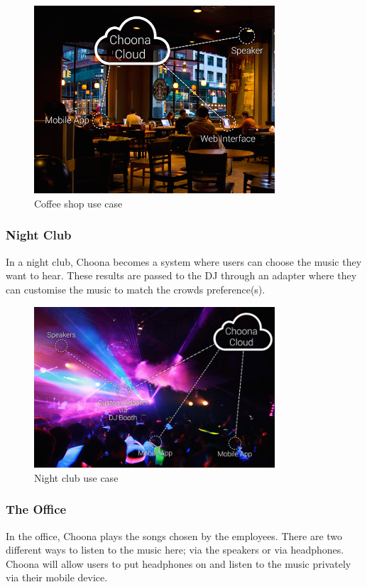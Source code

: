     \begin{figure}[h!]
      \centering
      \includegraphics[width=0.8\textwidth]{./img/coffee-shop.png}
      \caption{Coffee shop use case}
      \label{fig:coffee_shop}
    \end{figure}

\subsubsection{Night Club} 
In a night club, Choona becomes a system where users can choose the music they want to hear.  These results are passed to the DJ through an adapter where they can customise the music to match the crowds preference(s).  \\

    \begin{figure}[h!]
      \centering
      \includegraphics[width=0.8\textwidth]{./img/nightclub.png}
      \caption{Night club use case}
      \label{fig:night_club}
    \end{figure}

\subsubsection{The Office} 
In the office, Choona plays the songs chosen by the employees.  There are two different ways to listen to the music here; via the speakers or via headphones.  Choona will allow users to put headphones on and listen to the music privately via their mobile device. \\

